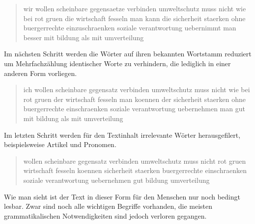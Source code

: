 \begin{quote}
\colorbox{rahmen}{wir} wollen scheinbare \colorbox{rahmen}{gegensaetze} verbinden umweltschutz muss nicht wie bei rot gruen \colorbox{rahmen}{die} wirtschaft fesseln man \colorbox{rahmen}{kann die} sicherheit staerken ohne buergerrechte einzuschraenken soziale verantwortung \colorbox{rahmen}{uebernimmt} man \colorbox{rahmen}{besser} mit bildung als mit umverteilung
\end{quote}

Im nächsten Schritt werden die Wörter auf ihren bekannten Wortstamm reduziert um Mehrfachzählung identischer Worte zu verhindern, die lediglich in einer anderen Form vorliegen. 
\newline
\begin{quote}
\colorbox{rahmen}{ich} wollen scheinbare gegensatz verbinden umweltschutz muss nicht \colorbox{rahmen}{wie} bei rot gruen \colorbox{rahmen}{der} wirtschaft fesseln \colorbox{rahmen}{man} koennen \colorbox{rahmen}{der} sicherheit staerken \colorbox{rahmen}{ohne} buergerrechte einschraenken soziale verantwortung uebernehmen \colorbox{rahmen}{man} gut \colorbox{rahmen}{mit} bildung \colorbox{rahmen}{als mit} umverteilung
\end{quote}

Im letzten Schritt werden für den Textinhalt irrelevante Wörter herausgefilert, beispielsweise Artikel und Pronomen.
\newline
\begin{quote}
wollen scheinbare gegensatz verbinden umweltschutz muss nicht rot gruen wirtschaft fesseln koennen sicherheit staerken buergerrechte einschraenken soziale verantwortung uebernehmen gut bildung umverteilung
\end{quote}

Wie man sieht ist der Text in dieser Form für den Menschen nur noch bedingt lesbar. Zwar sind noch alle wichtigen Begriffe vorhanden, die meisten grammatikalischen Notwendigkeiten sind jedoch verloren gegangen.

